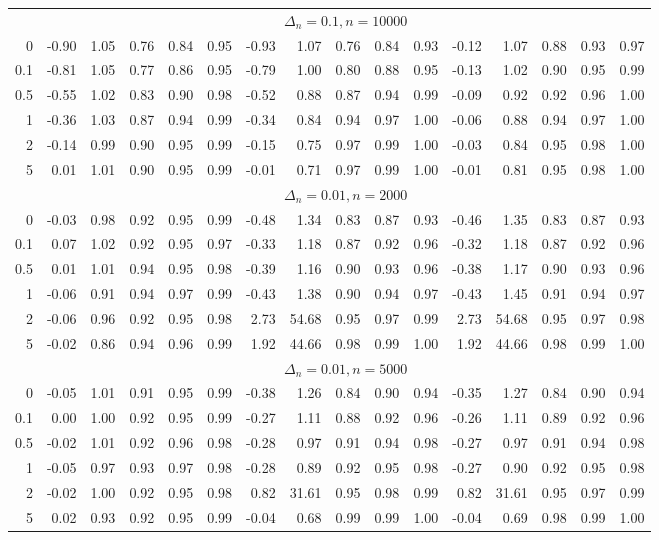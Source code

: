\documentclass{article}
\theoremstyle{plain}
\theoremstyle{definition}
\theoremstyle{remark}
\begin{document}
\begin{appendix}
{\begin{table}[ht]
\begin{tabular}{r|rrrrr|rrrrr|rrrrr}
\midrule
& \multicolumn{15}{c}{$\Delta_n=0.1, n= 10000$} \\
0 & -0.90 & 1.05 & 0.76 & 0.84 & 0.95 & -0.93 & 1.07 & 0.76 & 0.84 & 0.93 & -0.12 & 1.07 & 0.88 & 0.93 & 0.97 \\ 
  0.1 & -0.81 & 1.05 & 0.77 & 0.86 & 0.95 & -0.79 & 1.00 & 0.80 & 0.88 & 0.95 & -0.13 & 1.02 & 0.90 & 0.95 & 0.99 \\ 
  0.5 & -0.55 & 1.02 & 0.83 & 0.90 & 0.98 & -0.52 & 0.88 & 0.87 & 0.94 & 0.99 & -0.09 & 0.92 & 0.92 & 0.96 & 1.00 \\ 
  1 & -0.36 & 1.03 & 0.87 & 0.94 & 0.99 & -0.34 & 0.84 & 0.94 & 0.97 & 1.00 & -0.06 & 0.88 & 0.94 & 0.97 & 1.00 \\ 
  2 & -0.14 & 0.99 & 0.90 & 0.95 & 0.99 & -0.15 & 0.75 & 0.97 & 0.99 & 1.00 & -0.03 & 0.84 & 0.95 & 0.98 & 1.00 \\ 
  5 & 0.01 & 1.01 & 0.90 & 0.95 & 0.99 & -0.01 & 0.71 & 0.97 & 0.99 & 1.00 & -0.01 & 0.81 & 0.95 & 0.98 & 1.00 \\ 

\midrule
& \multicolumn{15}{c}{$\Delta_n=0.01, n= 2000$} \\
0 & -0.03 & 0.98 & 0.92 & 0.95 & 0.99 & -0.48 & 1.34 & 0.83 & 0.87 & 0.93 & -0.46 & 1.35 & 0.83 & 0.87 & 0.93 \\ 
  0.1 & 0.07 & 1.02 & 0.92 & 0.95 & 0.97 & -0.33 & 1.18 & 0.87 & 0.92 & 0.96 & -0.32 & 1.18 & 0.87 & 0.92 & 0.96 \\ 
  0.5 & 0.01 & 1.01 & 0.94 & 0.95 & 0.98 & -0.39 & 1.16 & 0.90 & 0.93 & 0.96 & -0.38 & 1.17 & 0.90 & 0.93 & 0.96 \\ 
  1 & -0.06 & 0.91 & 0.94 & 0.97 & 0.99 & -0.43 & 1.38 & 0.90 & 0.94 & 0.97 & -0.43 & 1.45 & 0.91 & 0.94 & 0.97 \\ 
  2 & -0.06 & 0.96 & 0.92 & 0.95 & 0.98 & 2.73 & 54.68 & 0.95 & 0.97 & 0.99 & 2.73 & 54.68 & 0.95 & 0.97 & 0.98 \\ 
  5 & -0.02 & 0.86 & 0.94 & 0.96 & 0.99 & 1.92 & 44.66 & 0.98 & 0.99 & 1.00 & 1.92 & 44.66 & 0.98 & 0.99 & 1.00 \\ 

\midrule
& \multicolumn{15}{c}{$\Delta_n=0.01, n= 5000$} \\
0 & -0.05 & 1.01 & 0.91 & 0.95 & 0.99 & -0.38 & 1.26 & 0.84 & 0.90 & 0.94 & -0.35 & 1.27 & 0.84 & 0.90 & 0.94 \\ 
  0.1 & 0.00 & 1.00 & 0.92 & 0.95 & 0.99 & -0.27 & 1.11 & 0.88 & 0.92 & 0.96 & -0.26 & 1.11 & 0.89 & 0.92 & 0.96 \\ 
  0.5 & -0.02 & 1.01 & 0.92 & 0.96 & 0.98 & -0.28 & 0.97 & 0.91 & 0.94 & 0.98 & -0.27 & 0.97 & 0.91 & 0.94 & 0.98 \\ 
  1 & -0.05 & 0.97 & 0.93 & 0.97 & 0.98 & -0.28 & 0.89 & 0.92 & 0.95 & 0.98 & -0.27 & 0.90 & 0.92 & 0.95 & 0.98 \\ 
  2 & -0.02 & 1.00 & 0.92 & 0.95 & 0.98 & 0.82 & 31.61 & 0.95 & 0.98 & 0.99 & 0.82 & 31.61 & 0.95 & 0.97 & 0.99 \\ 
  5 & 0.02 & 0.93 & 0.92 & 0.95 & 0.99 & -0.04 & 0.68 & 0.99 & 0.99 & 1.00 & -0.04 & 0.69 & 0.98 & 0.99 & 1.00 \\ 


\end{tabular}
\end{table}}
\end{appendix}
\end{document}
